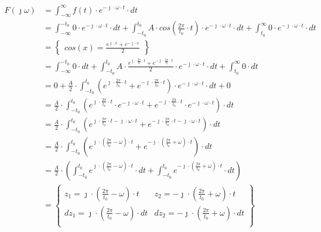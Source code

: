 \begin{task}
\begin{align*}
F(\jmath \omega )&=\int_{-\infty }^{\infty}f(t) \cdot e^{-\jmath \cdot \omega \cdot t}\cdot dt\\
&=\int_{-\infty }^{-t_0} 0 \cdot e^{-\jmath \cdot \omega \cdot t} \cdot dt + \int_{-t_0 }^{t_0} A \cdot cos\left(\frac{2\pi}{t_0}\cdot t\right) \cdot e^{-\jmath \cdot \omega \cdot t} \cdot dt + \int_{t_0 }^{\infty} 0 \cdot e^{-\jmath \cdot \omega \cdot t} \cdot dt \\
&=\begin{Bmatrix}
cos(x) = \frac{e^{\jmath \cdot x}+e^{-\jmath \cdot x}}{2}
\end{Bmatrix}\\
&=\int_{-\infty }^{-t_0} 0 \cdot dt + \int_{-t_0 }^{t_0} A \cdot \frac{e^{\jmath \cdot \frac{2\pi}{t_0}\cdot t}+e^{-\jmath \cdot \frac{2\pi}{t_0}\cdot t}}{2} \cdot e^{-\jmath \cdot \omega \cdot t} \cdot dt + \int_{t_0 }^{\infty} 0 \cdot dt \\
&=0 + \frac{A}{2} \cdot \int_{-t_0 }^{t_0} \left(e^{\jmath \cdot \frac{2\pi}{t_0}\cdot t}+e^{-\jmath \cdot \frac{2\pi}{t_0}\cdot t}\right) \cdot e^{-\jmath \cdot \omega \cdot t} \cdot dt + 0 \\
&=\frac{A}{2} \cdot \int_{-t_0 }^{t_0} \left(e^{\jmath \cdot \frac{2\pi}{t_0}\cdot t}\cdot e^{-\jmath \cdot \omega \cdot t}+e^{-\jmath \cdot \frac{2\pi}{t_0}\cdot t}\cdot e^{-\jmath \cdot \omega \cdot t}\right) \cdot dt \\
&=\frac{A}{2} \cdot \int_{-t_0 }^{t_0} \left(e^{\jmath \cdot \frac{2\pi}{t_0}\cdot t -\jmath \cdot \omega \cdot t}+e^{-\jmath \cdot \frac{2\pi}{t_0}\cdot t -\jmath \cdot \omega \cdot t}\right) \cdot dt \\
&=\frac{A}{2} \cdot \int_{-t_0 }^{t_0} \left(e^{\jmath \cdot \left(\frac{2\pi}{t_0} - \omega \right) \cdot t}+e^{-\jmath \cdot \left(\frac{2\pi}{t_0} + \omega \right) \cdot t}\right) \cdot dt \\
&=\frac{A}{2} \cdot \left( \int_{-t_0 }^{t_0} e^{\jmath \cdot \left(\frac{2\pi}{t_0} - \omega \right) \cdot t} \cdot dt + \int_{-t_0 }^{t_0} e^{-\jmath \cdot \left(\frac{2\pi}{t_0} + \omega \right) \cdot t} \cdot dt \right)\\
&=\begin{Bmatrix}
z_1=\jmath \cdot \left(\frac{2\pi}{t_0} - \omega \right) \cdot t & z_2=-\jmath \cdot \left(\frac{2\pi}{t_0} + \omega \right) \cdot t\\
dz_1=\jmath \cdot \left(\frac{2\pi}{t_0} - \omega \right) \cdot dt & dz_2=-\jmath \cdot \left(\frac{2\pi}{t_0} + \omega \right) \cdot dt\\

\end{Bmatrix}
\end{align*}
\end{task}
